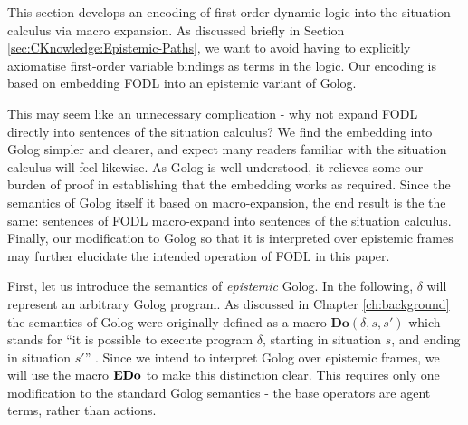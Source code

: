 This section develops an encoding of first-order dynamic logic into
the situation calculus via macro expansion. As discussed briefly in
Section \ref{sec:CKnowledge:Epistemic-Paths}, we want to avoid having
to explicitly axiomatise first-order variable bindings as terms in
the logic. Our encoding is based on embedding FODL into an epistemic
variant of Golog.

This may seem like an unnecessary complication - why not expand FODL
directly into sentences of the situation calculus? We find the embedding
into Golog simpler and clearer, and expect many readers familiar with
the situation calculus will feel likewise. As Golog is well-understood,
it relieves some our burden of proof in establishing that the embedding
works as required. Since the semantics of Golog itself it based on
macro-expansion, the end result is the the same: sentences of FODL
macro-expand into sentences of the situation calculus. Finally, our
modification to Golog so that it is interpreted over epistemic frames
may further elucidate the intended operation of FODL in this paper.

First, let us introduce the semantics of \emph{epistemic} Golog. In
the following, $\delta$ will represent an arbitrary Golog program.
As discussed in Chapter \ref{ch:background} the semantics of Golog
were originally defined as a macro $\mathbf{Do}(\delta,s,s')$ which
stands for {}``it is possible to execute program $\delta$, starting
in situation $s$, and ending in situation $s'$'' \citep{levesque97golog}.
Since we intend to interpret Golog over epistemic frames, we will
use the macro $\mathbf{EDo}$ to make this distinction clear. This requires
only one modification to the standard Golog semantics - the base operators
are agent terms, rather than actions.

